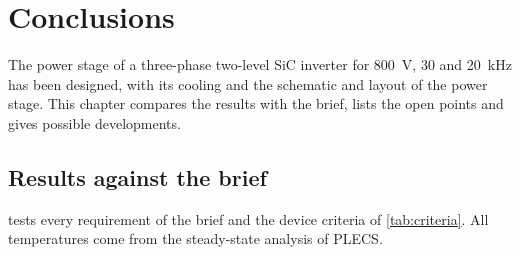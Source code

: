 \chapter{Conclusions}
\label{ch:conclusions}

The power stage of a three-phase two-level SiC inverter for \SI{800}{\volt},
\SI{30}{\Arms} and \SI{20}{\kilo\hertz} has been designed, with its cooling
and the schematic and layout of the power stage. This chapter compares the
results with the brief, lists the open points and gives possible
developments.

\section{Results against the brief}

 tests every requirement of the brief and the device
criteria of \cref{tab:criteria}. All temperatures come from the
steady-state analysis of PLECS.

